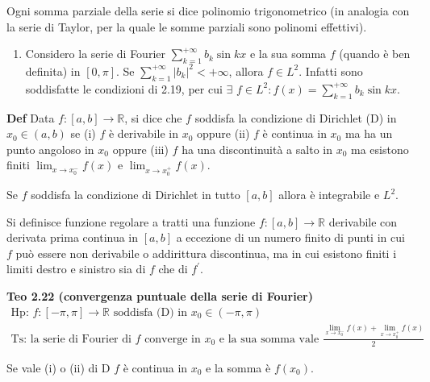 \documentclass{article}
\begin{document}
Ogni somma parziale della serie si dice polinomio trigonometrico (in
analogia con la serie di Taylor, per la quale le somme parziali sono
polinomi effettivi).

\begin{enumerate}
\item Considero la serie di Fourier $\sum_{k=1}^{+\infty }b_{k}\sin kx$ e la
sua somma $f$ (quando \`{e} ben definita) in $\left[ 0,\pi \right] $. Se $%
\sum_{k=1}^{+\infty }\left\vert b_{k}\right\vert ^{2}<+\infty $, allora $%
f\in L^{2}$. Infatti sono soddisfatte le condizioni di 2.19, per cui $%
\exists $ $f\in L^{2}:f\left( x\right) =\sum_{k=1}^{+\infty }b_{k}\sin kx$.
\end{enumerate}

\textbf{Def} Data $f:\left[ a,b\right] \rightarrow 
\mathbb{R}
$, si dice che $f$ soddisfa la condizione di Dirichlet (D) in $x_{0}\in
\left( a,b\right) $ se (i) $f$ \`{e} derivabile in $x_{0}$ oppure (ii) $f$ 
\`{e} continua in $x_{0}$ ma ha un punto angoloso in $x_{0}$ oppure (iii) $f$
ha una discontinuit\`{a} a salto in $x_{0}$ ma esistono finiti $%
\lim_{x\rightarrow x_{0}^{-}}f\left( x\right) $ e $\lim_{x\rightarrow
x_{0}^{+}}f\left( x\right) $.

Se $f$ soddisfa la condizione di Dirichlet in tutto $\left[ a,b\right] $ allora \`{e} integrabile e $L^{2}$.

Si definisce funzione regolare a tratti una funzione $f:\left[ a,b\right]
\rightarrow 
\mathbb{R}
$ derivabile con derivata prima continua in $\left[ a,b\right] $ a eccezione
di un numero finito di punti in cui $f$ pu\`{o} essere non derivabile o
addirittura discontinua, ma in cui esistono finiti i limiti destro e
sinistro sia di $f$ che di $f^{\prime }$.

\textbf{Teo 2.22 (convergenza puntuale della serie di Fourier)}%
\begin{gather*}
\text{Hp: }f:\left[ -\pi ,\pi \right] \rightarrow 
\mathbb{R}
\text{ soddisfa (D) in }x_{0}\in \left( -\pi ,\pi \right) \\
\text{Ts: la serie di Fourier di }f\text{ converge in }x_{0}\text{ e la sua
somma vale }\frac{\lim_{x\rightarrow x_{0}^{-}}f\left( x\right)
+\lim_{x\rightarrow x_{0}^{+}}f\left( x\right) }{2}
\end{gather*}

Se vale (i) o (ii) di D $f$ \`{e} continua in $x_{0}$ e la somma \`{e} $%
f\left( x_{0}\right) $.
\end{document}

